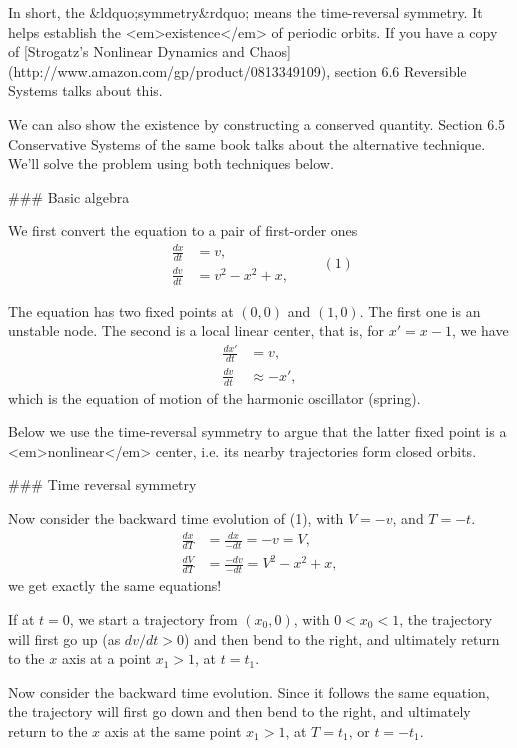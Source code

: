 In short, the &ldquo;symmetry&rdquo; means the time-reversal symmetry.  It helps establish the <em>existence</em> of periodic orbits.  If you have a copy of [Strogatz's Nonlinear Dynamics and Chaos](http://www.amazon.com/gp/product/0813349109), section 6.6 Reversible Systems talks about this.

We can also show the existence by constructing a conserved quantity.  Section 6.5 Conservative Systems of the same book talks about the alternative technique.  We'll solve the problem using both techniques below.

### Basic algebra

We first convert the equation to a pair of first-order ones
$$
\begin{aligned}
\frac{dx}{dt} &= v, \\
\frac{dv}{dt} &= v^2 - x^2 + x,
\end{aligned}
\quad \quad (1)
$$

The equation has two fixed points at $(0, 0)$ and $(1, 0)$.  The first one is an unstable node.  The second is a local linear center, that is, for $x' = x - 1$, we have
$$
\begin{aligned}
\frac{dx'}{dt} &= v, \\
\frac{dv}{dt} &\approx -x',
\end{aligned}
$$
which is the equation of motion of the harmonic oscillator (spring).

Below we use the time-reversal symmetry to argue that the latter fixed point is a <em>nonlinear</em> center, i.e. its nearby trajectories form closed orbits.


### Time reversal symmetry

Now consider the backward time evolution of (1), with $V = -v$, and $T = -t$.
$$
\begin{aligned}
\frac{dx}{dT} &= \frac{dx}{-dt} = -v = V, \\
\frac{dV}{dT} &= \frac{-dv}{-dt} = V^2 - x^2 + x,
\end{aligned}
$$
we get exactly the same equations!



If at $t = 0$, we start a trajectory from $(x_0, 0)$, with $0 < x_0 < 1$, the trajectory will first go up (as $dv/dt > 0$) and then bend to the right, and ultimately return to the $x$ axis at a point $x_1 > 1$, at $t = t_1$.

Now consider the backward time evolution.  Since it follows the same equation, the trajectory will first go down and then bend to the right, and ultimately return to the $x$ axis at the same point $x_1 > 1$, at $T = t_1$, or $t = -t_1$.

